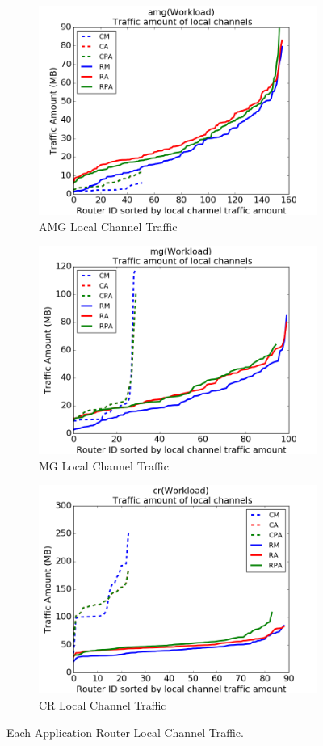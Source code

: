 \documentclass[conference,compsoc]{IEEEtran}
\begin{document}
\begin{figure}[t!]
    \centering
    \begin{subfigure}[t]{0.32\textwidth}
        \centering
        \includegraphics[height=1.8 in]{amg/lc-traffic}
        \caption{AMG Local Channel Traffic}
        \label{fig:amg-lc-traffic}
    \end{subfigure}%
    \hspace{1em}%
    \begin{subfigure}[t]{0.32\textwidth}
        \centering
        \includegraphics[height=1.8 in]{mg/lc-traffic}
        \caption{MG Local Channel Traffic}
        \label{fig:mg-lc-traffic}
    \end{subfigure}%
    \begin{subfigure}[t]{0.32\textwidth}
        \centering
        \includegraphics[height=1.8 in]{cr/lc-traffic}
        \caption{CR Local Channel Traffic}
        \label{fig:cr-lc-traffic}
    \end{subfigure}%
   \caption{Each Application Router Local Channel Traffic.  }
   \label{fig:3app-lc-traffic}
\end{figure}
\end{document}
